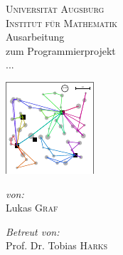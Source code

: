 \documentclass[a4paper,ngerman,12pt,bibtotoc]{scrartcl}
\theoremstyle{definition}
\theoremstyle{plain}
\theoremstyle{remark}
\begin{document}
\author{Lukas Graf}
\date{Letzte Aktualisierung: \today}

\thispagestyle{empty}


\begin{titlepage}\center
	\textsc{\LARGE Universität Augsburg}\\[1.5cm]
	
	\textsc{\Large Institut für Mathematik}\\[2.5cm]
	
	{\Large Ausarbeitung \\[1cm]}
	zum Programmierprojekt\\[1.5cm]
	{\huge ...}

	\begin{center}
		\includegraphics[width=.6\textwidth]{bilder/title.pdf}
	\end{center}		
	
	\vfill
	
	\begin{minipage}{0.4\textwidth}
		\begin{flushleft} \large
			\emph{von:}\\
			Lukas \textsc{Graf}
		\end{flushleft}
	\end{minipage}
	\begin{minipage}{0.4\textwidth}
		\begin{flushright} \large
			\emph{Betreut von:} \\
			Prof. Dr. Tobias \textsc{Harks}
		\end{flushright}
	\end{minipage}
	
\end{titlepage}
\end{document}
